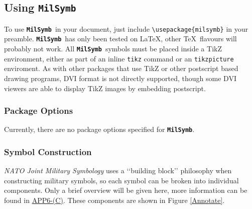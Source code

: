 \documentclass[a4paper, titlepage]{article}
\newcommand\MilSymb{\textbf{\texttt{MilSymb}}}
\newcommand\DocLink{\href{https://web.archive.org/web/20150921231042/http://armawiki.zumorc.de/files/NATO/APP-6(C).pdf}{APP6-(C)}}
\begin{document}
\subsection{Using \MilSymb}

To use \MilSymb\  in your document, just include \texttt{\textbackslash usepackage\{milsymb\}} in your preamble. \MilSymb\  has only been tested on \LaTeX, other \TeX\  flavours will probably not work. All \MilSymb\  symbols must be placed inside a TikZ environment, either as part of an inline \texttt{tikz} command or an \texttt{tikzpicture} enviroment. As with other packages that use TikZ or other postscript based drawing programs, DVI format is not directly supported, though some DVI viewers are able to display TikZ images by embedding postscript.

\subsubsection{Package Options}

Currently, there are no package options specified for \MilSymb.

\subsubsection{Symbol Construction}

\textit{NATO Joint Military Symbology} uses a \lq\lq{}building block\rq\rq{} philosophy when constructing military symbols, so each symbol can be broken into individual components. Only a brief overview will be given here, more information can be found in \DocLink. These components are shown in Figure \ref{Annotate}.
\end{document}
